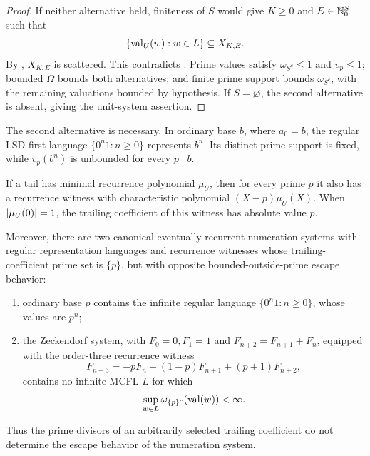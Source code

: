 \begin{proof}
  If neither alternative held, finiteness of \(S\) would give
  \(K\ge0\) and \(E\in\mathbb{N}_0^S\) such that
  \[
    \{\operatorname{val}_U(w):w\in L\}\subseteq X_{K,E}.
  \]
  By , \(X_{K,E}\) is scattered.
  This contradicts
  . Prime values satisfy
  \(\omega_{S^c}\le1\) and \(v_p\le1\); bounded \(\Omega\) bounds both
  alternatives; and finite prime support bounds \(\omega_{S^c}\), with
  the remaining valuations bounded by hypothesis. If \(S=\varnothing\),
  the second alternative is absent, giving the unit-system assertion.
\end{proof}

The second alternative is necessary. In ordinary base \(b\), where
\(a_0=b\), the regular LSD-first language
\(\{0^n1:n\ge0\}\) represents \(b^n\). Its distinct prime support is
fixed, while \(v_p(b^n)\) is unbounded for every \(p\mid b\).

\begin{proposition}
  \label{prop:recurrence-witness-separation}
  If a tail has minimal recurrence polynomial \(\mu_U\), then for every
  prime \(p\) it also has a recurrence witness with characteristic
  polynomial \((X-p)\mu_U(X)\).  When \(\lvert \mu_U(0) \rvert=1\), the trailing
  coefficient of this witness has absolute value \(p\).

  Moreover, there are two canonical eventually recurrent
  numeration systems with regular representation languages and recurrence
  witnesses whose trailing-coefficient prime set is \(\{p\}\), but with
  opposite bounded-outside-prime escape behavior:
  \begin{enumerate}[label=\textup{(\roman*)}]
    \item ordinary base \(p\) contains the infinite regular language
    \(\{0^n1:n\ge0\}\), whose values are \(p^n\);
    \item the Zeckendorf system, with \(F_0=0,F_1=1\) and
    \(F_{n+2}=F_{n+1}+F_n\), equipped with the order-three recurrence
    witness
    \[
      F_{n+3}=-pF_n+(1-p)F_{n+1}+(p+1)F_{n+2},
    \]
    contains no infinite MCFL \(L\) for which
    \[
      \sup_{w\in L}\omega_{\{p\}^c}(\operatorname{val}(w))<\infty.
    \]
  \end{enumerate}
  Thus the prime divisors of an arbitrarily selected trailing coefficient
  do not determine the escape behavior of the numeration system.
\end{proposition}

